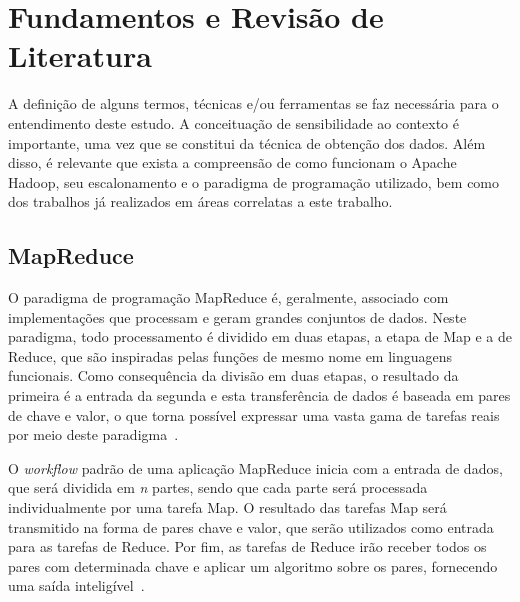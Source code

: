 \chapter{Fundamentos e Revisão de Literatura}
\label{chap:fundamentacao}
A definição de alguns termos, técnicas e/ou ferramentas se faz necessária para o entendimento deste estudo. A conceituação de sensibilidade ao contexto é importante, uma vez que se constitui da técnica de obtenção dos dados. 
Além disso, é relevante que exista a compreensão de como funcionam o Apache Hadoop, seu escalonamento e o paradigma de programação utilizado, bem como dos trabalhos já realizados em áreas correlatas a este trabalho.


\section{MapReduce}
O paradigma de programação MapReduce é, geralmente, associado com implementações que processam e geram grandes conjuntos de dados. Neste paradigma, todo processamento é dividido em duas etapas, a etapa de Map e a de Reduce, que são inspiradas pelas funções de mesmo nome em linguagens funcionais. Como consequência da divisão em duas etapas, o resultado da primeira é a entrada da segunda e esta transferência de dados é baseada em pares de chave e valor, o que torna possível expressar uma vasta gama de tarefas reais por meio deste paradigma~\cite{Dean}.

O \textit{workflow} padrão de uma aplicação MapReduce inicia com a entrada de dados, que será dividida em \textit{n} partes, sendo que cada parte será processada individualmente por uma tarefa Map. O resultado das tarefas Map será transmitido na forma de pares chave e valor, que serão utilizados como entrada para as tarefas de Reduce. Por fim, as tarefas de Reduce irão receber todos os pares com determinada chave e aplicar um algoritmo sobre os pares, fornecendo uma saída inteligível~\cite{BookHadoop}.


